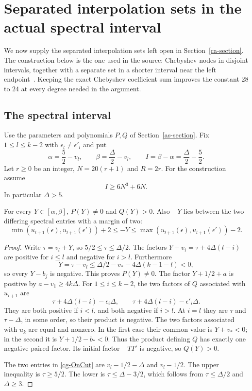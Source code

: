 \section{Separated interpolation sets in the actual spectral interval}
\label{cg-section}

We now supply the separated interpolation sets left open in
Section~\ref{ca-section}.  The construction below is the one
used in the source: Chebyshev nodes in disjoint intervals,
together with a separate set in a shorter interval near the
left endpoint~\cite{alpo-uniform-source}.  Keeping the exact
Chebyshev coefficient sum improves the constant $28$ to $24$
at every degree needed in the argument.

\subsection{The spectral interval}

Use the parameters and polynomials $P,Q$ of
Section~\ref{as-section}.  Fix
$1\leq l\leq k-2$ with $\epsilon_l\ne\epsilon'_l$ and put
\[
 \alpha=\frac52-v_l,\qquad
 \beta=\frac{\Delta}{2}-v_l,\qquad
 I=\beta-\alpha=\frac{\Delta}{2}-\frac52.
\]
Let $r\geq0$ be an integer, $N=20(r+1)$ and $R=2r$.
For the construction assume
\begin{equation}\label{cg-length}
                        I\geq6N^3+6N.
\end{equation}
In particular $\Delta>5$.

\begin{lemma}\label{cg-spectral}
For every $Y\in[\alpha,\beta]$, $P(Y)\ne0$ and $Q(Y)>0$.
Also $-Y$ lies between the two differing spectral entries
with a margin of two:
\begin{equation}\label{cg-OnCut}
 \min(u_{l+1}(\epsilon),u_{l+1}(\epsilon'))+2
       \leq -Y
       \leq\max(u_{l+1}(\epsilon),u_{l+1}(\epsilon'))-2.
\end{equation}
\end{lemma}

\begin{proof}
Write $\tau=v_l+Y$, so $5/2\leq\tau\leq\Delta/2$.
The factors $Y+v_i=\tau+4\Delta(l-i)$ are positive
for $i\leq l$ and negative for $i>l$.
Furthermore
\[
 Y=\tau-v_l\leq\Delta/2-v_*-4\Delta(k-1-l)<0,
\]
so every $Y-b_j$ is negative.  This proves $P(Y)\ne0$.
The factor $Y+1/2+a$ is positive by
$a-v_1\geq4k\Delta$.
For $1\leq i\leq k-2$, the two factors of $Q$
associated with $u_{i+1}$ are
\[
              \tau+4\Delta(l-i)-\epsilon_i\Delta,
       \qquad \tau+4\Delta(l-i)-\epsilon'_i\Delta.
\]
They are both positive if $i<l$, and both negative if
$i>l$.  At $i=l$ they are $\tau$ and $\tau-\Delta$,
in some order, so their product is negative.
The two factors associated with $u_k$ are equal and
nonzero.  In the first case their common value is
$Y+v_*<0$; in the second it is $Y+1/2-b_*<0$.
Thus the product defining $Q$ has exactly one negative
paired factor.  Its initial factor $-TT'$ is negative,
so $Q(Y)>0$.

The two entries in \eqref{cg-OnCut} are
$v_l-1/2-\Delta$ and $v_l-1/2$.
The upper inequality is $\tau\geq5/2$.
The lower is $\tau\leq\Delta-3/2$, which follows from
$\tau\leq\Delta/2$ and $\Delta\geq3$.
\end{proof}

